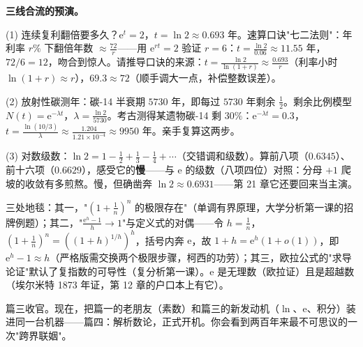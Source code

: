 \begin{shaonao}
\textbf{三线合流的预演。}

(1) 连续复利翻倍要多久？$\mathrm{e}^t = 2$，$t = \ln2 \approx 0.693$ 年。速算口诀"七二法则"：年利率 $r\%$ 下翻倍年数 $\approx \tfrac{72}{r}$——用 $\mathrm{e}^{rt} = 2$ 验证 $r = 6$：$t = \tfrac{\ln2}{0.06} \approx 11.55$ 年，$72/6 = 12$，吻合到惊人。请推导口诀的来源：$t = \tfrac{\ln 2}{\ln(1+r)} \approx \tfrac{0.693}{r}$（利率小时 $\ln(1+r)\approx r$），$69.3\approx72$（顺手调大一点，补偿整数误差）。

(2) 放射性碳测年：碳-14 半衰期 $5730$ 年，即每过 $5730$ 年剩余 $\tfrac12$。剩余比例模型 $N(t) = \mathrm{e}^{-\lambda t}$，$\lambda = \tfrac{\ln 2}{5730}$。考古测得某遗物碳-14 剩 $30\%$：$\mathrm{e}^{-\lambda t} = 0.3$，$t = \tfrac{\ln(10/3)}{\lambda} \approx \tfrac{1.204}{1.21\times10^{-4}} \approx 9950$ 年。亲手复算这两步。

(3) 对数级数：$\ln 2 = 1 - \tfrac12 + \tfrac13 - \tfrac14 + \cdots$（交错调和级数）。算前八项（$0.6345$）、前十六项（$0.6629$），感受它的\textbf{慢}——与 $\mathrm{e}$ 的级数（八项四位）对照：分母 $+1$ 爬坡的收敛有多煎熬。慢，但确凿奔 $\ln 2 \approx 0.6931$——第 21 章它还要回来当主演。
\end{shaonao}

\begin{chengshi}
三处地毯：其一，"$\left(1+\tfrac1n\right)^n$ 的极限存在"（单调有界原理，大学分析第一课的招牌例题）；其二，"$\tfrac{\mathrm{e}^h-1}{h}\to1$"与定义式的对偶——令 $h = \tfrac1n$，$\left(1+\tfrac1n\right)^n = \left(\left(1+h\right)^{1/h}\right)^h$，括号内奔 $\mathrm{e}$，故 $1+h = \mathrm{e}^h(1+o(1))$，即 $\mathrm{e}^h - 1 \approx h$（严格版需交换两个极限步骤，柯西的功劳）；其三，欧拉公式的"求导论证"默认了复指数的可导性（复分析第一课）。$\mathrm{e}$ 是无理数（欧拉证）且是超越数（埃尔米特 1873 年证，第 12 章的户口本上有它）。
\end{chengshi}

篇三收官。现在，把篇一的老朋友（素数）和篇三的新发动机（$\ln$、$\mathrm{e}$、积分）装进同一台机器——篇四：解析数论，正式开机。你会看到两百年来最不可思议的一次"跨界联姻"。
